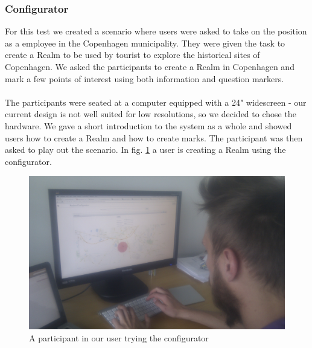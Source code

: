 \subsubsection{Configurator} %
\label{sub:configuration_manager_evaluation}
For this test we created a scenario where users were asked to take on the position as a employee in the Copenhagen municipality. They were given the task to create a Realm to be used by tourist to explore the historical sites of Copenhagen. We asked the participants to create a Realm in Copenhagen and mark a few points of interest using both information and question markers.
\\\\
The participants were seated at a computer equipped with a 24" widescreen - our current design is not well suited for low resolutions, so we decided to chose the hardware. We gave a short introduction to the system as a whole and showed users how to create a Realm and how to create marks. The participant was then asked to play out the scenario. In fig. \ref{fig:testing} a user is creating a Realm using the configurator.

\begin{figure}
	\centering
	\includegraphics[scale=0.14]{fig/testing}
	\caption{A participant in our user trying the configurator}
	\label{fig:testing}
\end{figure}

